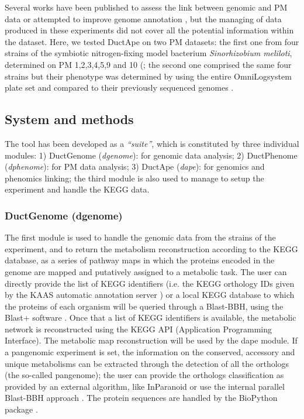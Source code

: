 Several works have been published to assess the link between genomic and PM data \cite{biondi2009metabolic}\cite{viti2009involvement}\cite{peleg2012success} or attempted to improve genome annotation \cite{reed2006towards}, but the managing of data produced in these experiments did not cover all the potential information within the dataset. Here, we tested DuctApe on two PM datasets: the first one from four strains of the symbiotic nitrogen-fixing model bacterium \textit{Sinorhizobium meliloti}, determined on PM 1,2,3,4,5,9 and 10 (\cite{biondi2009metabolic}; the second one comprised the same four strains but their phenotype was determined by using the entire OmniLog\texttrademark system plate set and compared to their previously sequenced genomes \cite{galardini2011exploring}.

\subsection{System and methods}
The tool has been developed as a \textit{“suite”}, which is constituted by three individual modules: 1) DuctGenome (\textit{dgenome}): for genomic data analysis; 2) DuctPhenome (\textit{dphenome}): for PM data analysis; 3) DuctApe (\textit{dape}): for genomics and phenomics linking; the third module is also used to manage to setup the experiment and handle the KEGG data.
 
\subsubsection{DuctGenome (dgenome)}
The first module is used to handle the genomic data from the strains of the experiment, and to return the metabolism reconstruction according to the KEGG database, as a series of pathway maps in which the proteins encoded in the genome are mapped and putatively assigned to a metabolic task. The user can directly provide the list of KEGG identifiers (i.e. the KEGG orthology IDs given by the KAAS automatic annotation server \cite{moriya2007kaas}) or a local KEGG database to which the proteins of each organism will be queried through a Blast-BBH, using the Blast+ software \cite{camacho2009blast+}. Once that a list of KEGG identifiers is available, the metabolic network is reconstructed using the KEGG API (Application Programming Interface). The metabolic map reconstruction will be used by the dape module. If a pangenomic experiment is set, the information on the conserved, accessory and unique metabolisms can be extracted through the detection of all the orthologs (the so-called pangenome); the user can provide the orthologs classification as provided by an external algorithm, like InParanoid \cite{ostlund2010inparanoid} or use the internal parallel Blast-BBH approach \cite{popa2011directed}. The protein sequences are handled by the BioPython package \cite{cock2009biopython}.

